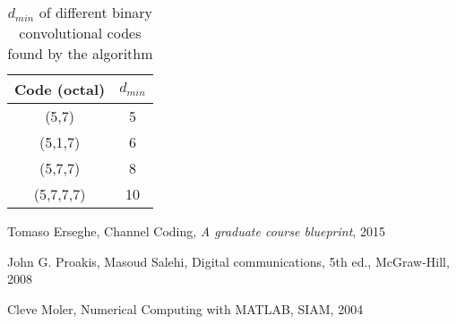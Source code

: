 \documentclass[10pt]{article}
\begin{document}
\begin{table}[h]
	\centering
	\begin{tabular}{c|c}
		\toprule
		Code (octal) & $d_{min}$ \\
		\midrule
		(5,7) & 5 \\
		(5,1,7) & 6 \\
		(5,7,7) & 8 \\
		(5,7,7,7) & 10 \\
	\end{tabular}
	\caption{$d_{min}$ of different binary convolutional codes found by the algorithm}
	\label{table:dmin}
\end{table}

\begin{thebibliography}{10}

 Tomaso Erseghe, Channel Coding, \emph{A graduate course blueprint}, 2015

 John G. Proakis, Masoud Salehi, Digital communications, 5th ed., McGraw-Hill, 2008

 Cleve Moler, Numerical Computing with MATLAB, SIAM, 2004

\end{thebibliography}
\end{document}

